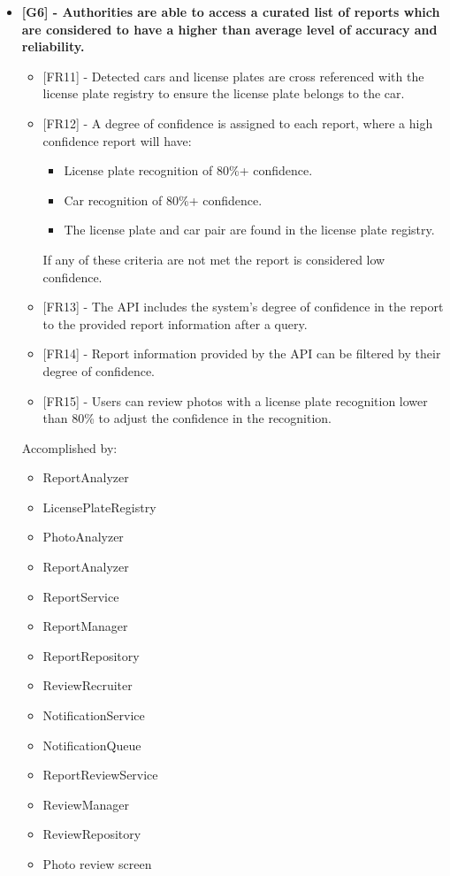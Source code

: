 \begin{itemize}[label={}]
    \item \textbf{[G6] - Authorities are able to access a curated list of reports which are considered to have a higher than average level of accuracy and reliability.}
        \begin{itemize}[label={}]
            \item {[FR11]} - Detected cars and license plates are cross referenced with the license plate registry to ensure the license plate belongs to the car.
            \item {[FR12]} - A degree of confidence is assigned to each report, where a high confidence report will have:
                \begin{itemize}[label={\textbullet}]
                    \item License plate recognition of 80\%+ confidence.
                    \item Car recognition of 80\%+ confidence.
                    \item The license plate and car pair are found in the license plate registry.
                \end{itemize}
            If any of these criteria are not met the report is considered low confidence.
            \item {[FR13]} - The API includes the system’s degree of confidence in the report to the provided report information after a query.
            \item {[FR14]} - Report information provided by the API can be filtered by their degree of confidence.
            \item {[FR15]} - Users can review photos with a license plate recognition lower than 80\% to adjust the confidence in the recognition.
        \end{itemize}
        Accomplished by:
        \begin{itemize}[label={\textbullet}]
            \item ReportAnalyzer
            \item LicensePlateRegistry
            \item PhotoAnalyzer
            \item ReportAnalyzer
            \item ReportService
            \item ReportManager
            \item ReportRepository
            \item ReviewRecruiter
            \item NotificationService
            \item NotificationQueue
            \item ReportReviewService
            \item ReviewManager
            \item ReviewRepository
            \item Photo review screen
        \end{itemize}


\end{itemize}
